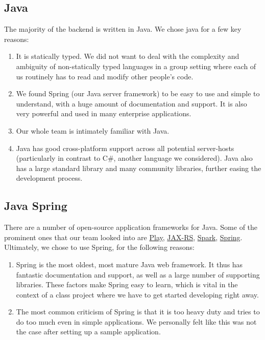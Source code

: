 \documentclass[12pt]{article}
\begin{document}
\subsection{Java}
The majority of the backend is written in Java. We chose java for a few key reasons:
\begin{enumerate}
    \item It is statically typed. We did not want to deal with the complexity and ambiguity of non-statically typed languages in a group setting where each of us routinely has to read and modify other people's code. 
    \item We found Spring (our Java server framework) to be easy to use and simple to understand, with a huge amount of documentation and support. It is also very powerful and used in many enterprise applications. 
    \item Our whole team is intimately familiar with Java. 
    \item Java has good cross-platform support across all potential server-hosts (particularly in contrast to C\#, another language we considered). Java also has a large standard library and many community libraries, further easing the development process. 
\end{enumerate}

\subsection{Java Spring}
There are a number of open-source application frameworks for Java. Some of the prominent ones that our team looked into are \href{https://www.playframework.com/}{Play}, \href{https://jax-rs-spec.java.net/}{JAX-RS}, \href{http://sparkjava.com}{Spark}, \href{https://spring.io/}{Spring}. Ultimately, we chose to use Spring, for the following reasons:
\begin{enumerate}
    \item Spring is the most oldest, most mature Java web framework. It thus has fantastic documentation and support, as well as a large number of supporting libraries.  These factors make Spring easy to learn, which is vital in the context of a class project where we have to get started developing right away. 
    \item The most common criticism of Spring is that it is too heavy duty and tries to do too much even in simple applications. We personally felt like this was not the case after setting up a sample application.
\end{enumerate}
\end{document}
